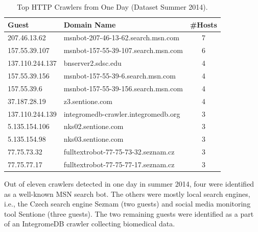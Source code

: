 \begin{table}[ht]
\centering
\begin{tabular}{| l | l | c |} \hline
Guest & Domain Name & \#Hosts \\ \hline
207.46.13.62    & msnbot-207-46-13-62.search.msn.com  & 7 \\ \hline
157.55.39.107   & msnbot-157-55-39-107.search.msn.com & 6 \\ \hline
137.110.244.137 & bnserver2.sdsc.edu                  & 4 \\ \hline
157.55.39.156   & msnbot-157-55-39-6.search.msn.com   & 4 \\ \hline
157.55.39.6 & msnbot-157-55-39-156.search.msn.com & 4 \\ \hline
37.187.28.19    & z3.sentione.com                     & 4 \\ \hline
137.110.244.139 & integromedb-crawler.integromedb.org & 3 \\ \hline
5.135.154.106   & nks02.sentione.com                  & 3 \\ \hline
5.135.154.98    & nks03.sentione.com                  & 3 \\ \hline
77.75.73.32 & fulltextrobot-77-75-73-32.seznam.cz & 3 \\ \hline
77.75.77.17 & fulltextrobot-77-75-77-17.seznam.cz & 3 \\ \hline
\end{tabular}
\caption{Top HTTP Crawlers from One Day (Dataset Summer 2014).}
\label{tab:httpsecurity-crawlers}
\end{table}

Out of eleven crawlers detected in one day in summer 2014, four were identified as a well-known MSN search bot. The others were mostly local search engines, i.e., the Czech search engine Seznam (two guests) and social media monitoring tool Sentione (three guests). The two remaining guests were identified as a part of an IntegromeDB crawler collecting biomedical data.


